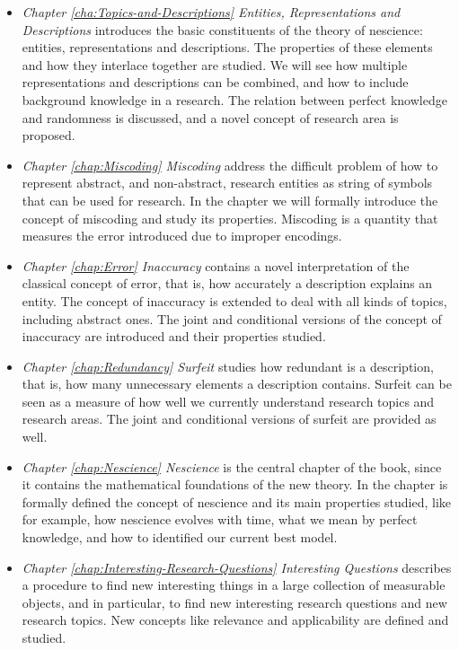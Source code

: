 \begin{itemize}

\item \emph{Chapter \ref{cha:Topics-and-Descriptions} Entities, Representations and Descriptions} introduces the basic constituents of the theory of nescience: entities, representations and descriptions. The properties of these elements and how they interlace together are studied. We will see how multiple representations and descriptions can be combined, and how to include background knowledge in a research. The relation between perfect knowledge and randomness is discussed, and a novel concept of research area is proposed.

\item \emph{Chapter \ref{chap:Miscoding} Miscoding} address the difficult problem of how to represent abstract, and non-abstract, research entities as string of symbols that can be used for research. In the chapter we will formally introduce the concept of miscoding and study its properties. Miscoding is a quantity that measures the error introduced due to improper encodings.

\item \emph{Chapter \ref{chap:Error} Inaccuracy} contains a novel interpretation of the classical concept of error, that is, how accurately a description explains an entity. The concept of inaccuracy is extended to deal with all kinds of topics, including abstract ones. The joint and conditional versions of the concept of inaccuracy are introduced and their properties studied.

\item \emph{Chapter \ref{chap:Redundancy} Surfeit} studies how redundant is a description, that is, how many unnecessary elements a description contains. Surfeit can be seen as a measure of how well we currently understand research topics and research areas. The joint and conditional versions of surfeit are provided as well.

\item \emph{Chapter \ref{chap:Nescience} Nescience} is the central chapter of the book, since it contains the mathematical foundations of the new theory. In the chapter is formally defined the concept of nescience and its main properties studied, like for example, how nescience evolves with time, what we mean by perfect knowledge, and how to identified our current best model.

\item \emph{Chapter \ref{chap:Interesting-Research-Questions} Interesting Questions} describes a procedure to find new interesting things in a large collection of measurable objects, and in particular, to find new interesting research questions and new research topics. New concepts like relevance and applicability are defined and studied.


\end{itemize}

